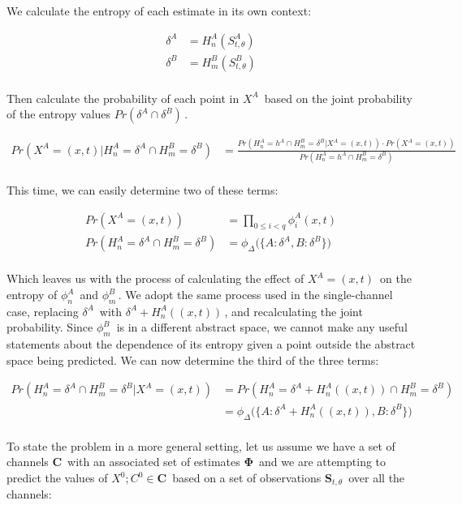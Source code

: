 \documentclass[11pt,titlepage]{article}
\begin{document}
We calculate the entropy of each estimate in its own context:

\[ 
\begin{align}
\delta^A &= H_n^A( S_{t,\theta}^A ) \\
\delta^B &= H_m^B( S_{t,\theta}^B ) \\
\end{align}
\]

Then calculate the probability of each point in \(X^A \,\!\) based on the joint probability of the entropy values \(Pr(\delta^A \cap \delta^B) \,\!\).

\[ 
\begin{align}
Pr( X^A = (x,t) | H_n^A = \delta^A \cap H_m^B = \delta^B ) &= \frac 
{ Pr( H_n^A = h^A \cap H_m^B = \delta^B | X^A = (x,t) ) \cdot Pr( X^A = (x,t) ) }
{ Pr( H_n^A = h^A \cap H_m^B = \delta^B ) } \\
\end{align}
\]

This time, we can easily determine two of these terms:

\[ 
\begin{align}
Pr( X^A = (x,t) ) &= \prod_{0 \le i < q} \phi_i^A(x,t) \\
Pr( H_n^A = \delta^A \cap H_m^B = \delta^B ) &= \phi_\Delta \Big( \{ A: \delta^A, B: \delta^B \} \Big) \\
\end{align}
\]

Which leaves us with the process of calculating the effect of \(X^A = (x,t) \,\!\) on the entropy of \(\phi_n^A \,\!\) and \(\phi_m^B \,\!\).  We adopt the same process used in the single-channel case, replacing \(\delta^A \,\!\) with \(\delta^A + H_n^A((x,t)) \,\!\), and recalculating the joint probability. Since \(\phi_m^B \,\!\) is in a different abstract space, we cannot make any useful statements about the dependence of its entropy given a point outside the abstract space being predicted.  We can now determine the third of the three terms:

\[ 
\begin{align}
Pr( H_n^A = \delta^A \cap H_m^B = \delta^B | X^A = (x,t) ) &= Pr( H_n^A = \delta^A + H_n^A((x,t)) \cap H_m^B = \delta^B ) \\
&= \phi_\Delta \Big( \{ A:\delta^A + H_n^A((x,t)), B: \delta^B \} \Big) \\
\end{align}
\]

To state the problem in a more general setting, let us assume we have a set of channels \(\mathbf{C} \,\!\) with an associated set of estimates \(\mathbf{\Phi} \,\!\) and we are attempting to predict the values of \(X^0; C^0 \in \mathbf{C} \,\!\) based on a set of observations \(\mathbf{S}_{t,\theta} \,\!\) over all the channels:
\end{document}
